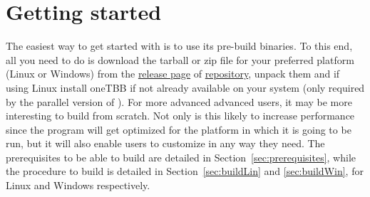 \section{Getting started} \label{sec:installation}
The easiest way to get started with \asli{} is to use its pre-build binaries. To this end, all you need to do is download the tarball or zip file for your preferred platform (Linux or Windows) from the \href{https://github.com/tpms-lattice/ASLI/releases}{release page} of \href{https://github.com/tpms-lattice/ASLI}{\asli{} repository}, unpack them and if using Linux install oneTBB if not already available on your system (only required by the parallel version of \asli{}). For more advanced advanced users, it may be more interesting to build \asli{} from scratch. Not only is this likely to increase performance since the program will get optimized for the platform in which it is going to be run, but it will also enable users to customize \asli{} in any way they need. The prerequisites to be able to build \asli{} are detailed in Section~\ref{sec:prerequisites}, while the procedure to build \asli{} is detailed in Section~\ref{sec:buildLin} and \ref{sec:buildWin}, for Linux and Windows respectively. 

